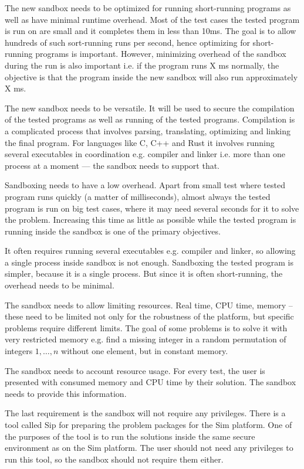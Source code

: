 \documentclass[en]{pracamgr}
\begin{document}
The new sandbox needs to be optimized for running short-running programs as well as have minimal runtime overhead. Most of the test cases the tested program is run on are small and it completes them in less than 10ms. The goal is to allow hundreds of such sort-running runs per second, hence optimizing for short-running programs is important. However, minimizing overhead of the sandbox during the run is also important i.e. if the program runs X ms normally, the objective is that the program inside the new sandbox will also run approximately X ms.

The new sandbox needs to be versatile. It will be used to secure the compilation of the tested programs as well as running of the tested programs. Compilation is a complicated process that involves parsing, translating, optimizing and linking the final program. For languages like C, C++ and Rust it involves running several executables in coordination e.g. compiler and linker i.e. more than one process at a moment --- the sandbox needs to support that.

Sandboxing needs to have a low overhead. Apart from small test where tested program runs quickly (a matter of milliseconds), almost always the tested program is run on big test cases, where it may need several seconds for it to solve the problem. Increasing this time as little as possible while the tested program is running inside the sandbox is one of the primary objectives.

It often requires running several executables e.g. compiler and linker, so allowing a single process inside sandbox is not enough. Sandboxing the tested program is simpler, because it is a single process. But since it is often short-running, the overhead needs to be minimal.

The sandbox needs to allow limiting resources. Real time, CPU time, memory -- these need to be limited not only for the robustness of the platform, but specific problems require different limits. The goal of some problems is to solve it with very restricted memory e.g. find a missing integer in a random permutation of integers $1, \ldots, n$ without one element, but in constant memory.

The sandbox needs to account resource usage. For every test, the user is presented with consumed memory and CPU time by their solution. The sandbox needs to provide this information.

The last requirement is the sandbox will not require any privileges. There is a tool called Sip \cite{sip} for preparing the problem packages for the Sim platform. One of the purposes of the tool is to run the solutions inside the same secure environment as on the Sim platform. The user should not need any privileges to run this tool, so the sandbox should not require them either.
\end{document}
